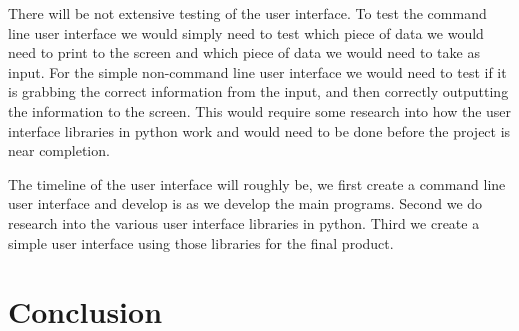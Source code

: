 \documentclass[onecolumn, draftclsnofoot,10pt, compsoc]{IEEEtran}
\begin{document}
There will be not extensive testing of the user interface. To test the command line user interface we would simply need to test which piece of data we would need to print to the screen and which piece of data we would need to take as input. For the simple non-command line user interface we would need to test if it is grabbing the correct information from the input, and then correctly outputting the information to the screen. This would require some research into how the user interface libraries in python work and would need to be done before the project is near completion.

The timeline of the user interface will roughly be, we first create a command line user interface and develop is as we develop the main programs. Second we do research into the various user interface libraries in python. Third we create a simple user interface using those libraries for the final product.

\section{Conclusion}




\end{document}
